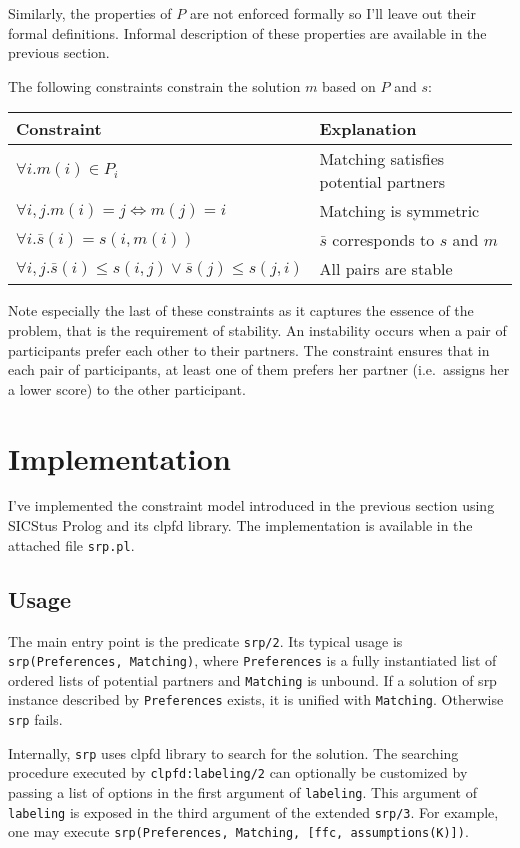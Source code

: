 \documentclass{article}
\newcommand{\file}[1]{\texttt{#1}}
\newcommand{\code}[1]{\texttt{#1}}
\newcommand{\clpfd}{\acrshort{clpfd}}
\newcommand{\prolog}{Prolog}
\newcommand{\sicstusprolog}{SICStus \prolog{}}
\newcommand{\srp}{\acrshort{srp}}
\begin{document}
Similarly, the properties of $P$ are not enforced formally so I'll leave out their
formal definitions.
Informal description of these properties are available in the previous section.

The following constraints constrain the solution $m$ based on $P$ and $s$:

\begin{tabular}{l | l}
Constraint & Explanation \\
\hline
$\forall i. m(i) \in P_i$ & Matching satisfies potential partners \\
$\forall i,j. m(i) = j \Leftrightarrow m(j) = i$ & Matching is symmetric \\
$\forall i. \bar{s}(i) = s(i, m(i))$ & $\bar{s}$ corresponds to $s$ and $m$ \\
$\forall i,j. \bar{s}(i) \leq s(i,j) \vee \bar{s}(j) \leq s(j,i)$ & All pairs are stable
\end{tabular}

Note especially the last of these constraints
as it captures the essence of the problem, that is the requirement of stability.
An instability occurs when a pair of participants prefer each other to their partners.
The constraint ensures that in each pair of participants,
at least one of them prefers her partner (i.e.~assigns her a lower score)
to the other participant.

\section{Implementation}
I've implemented the constraint model introduced in the previous section
using \sicstusprolog{} and its \clpfd{} library.
The implementation is available in the attached file \file{srp.pl}.

\subsection{Usage}
The main entry point is the predicate \code{srp/2}.
Its typical usage is \code{srp(Preferences, Matching)},
where \code{Preferences} is a fully instantiated list of ordered lists
of potential partners
and \code{Matching} is unbound.
If a solution of \srp{} instance described by \code{Preferences} exists,
it is unified with \code{Matching}.
Otherwise \code{srp} fails.

Internally, \code{srp} uses \clpfd{} library to search for the solution.
The searching procedure executed by \code{clpfd:labeling/2}
can optionally be customized by passing a list of options in the first argument
of \code{labeling}.
This argument of \code{labeling} is exposed
in the third argument of the extended \code{srp/3}.
For example, one may execute \code{srp(Preferences, Matching, [ffc, assumptions(K)])}.
\end{document}
